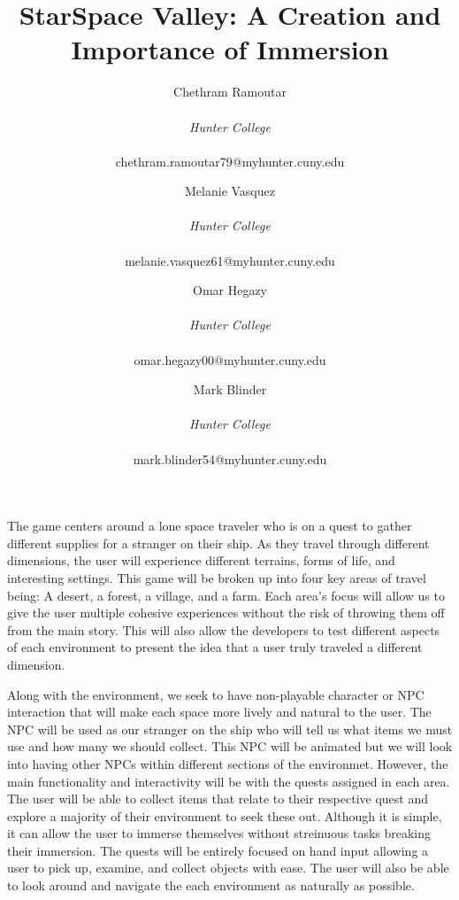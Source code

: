 \documentclass{vgtc}                          %
\title{StarSpace Valley: A Creation and Importance of Immersion}
\author{Chethram Ramoutar\\ %
    \parbox{1.4in}{\scriptsize  \centering\emph{Hunter College}}\\
    \scriptsize{chethram.ramoutar79@myhunter.cuny.edu}
\and Melanie Vasquez\\ %
    \parbox{1.4in}{\scriptsize \centering\emph{Hunter College}}\\
    \scriptsize{melanie.vasquez61@myhunter.cuny.edu}
\and Omar Hegazy\\ %
    \parbox{1.4in}{\scriptsize  \centering\emph{Hunter College}}\\
    \scriptsize{omar.hegazy00@myhunter.cuny.edu}\\
\and Mark Blinder\\ %
    \parbox{1.4in}{\scriptsize  \centering\emph{Hunter College}}\\
    \scriptsize{mark.blinder54@myhunter.cuny.edu}}
\begin{document}
\maketitle



The game centers around a lone space traveler who is on a quest to gather different supplies for a stranger on their ship. As they travel through
different dimensions, the user will experience different terrains, forms of life, and interesting settings. This game will be broken up into four key
areas of travel being: A desert, a forest, a village, and a farm. Each area's focus will allow us to give the user multiple cohesive experiences without
the risk of throwing them off from the main story. This will also allow the developers to test different aspects of each environment to present the idea that
a user truly traveled a different dimension.

Along with the environment, we seek to have non-playable character or NPC interaction that will make each space more lively and natural to the user. The NPC will be used as our stranger on the ship who will tell us what items
we must use and how many we should collect. This NPC will be animated but we will look into having other NPCs within different sections of the environmet. However, the main
functionality and interactivity will be with the quests assigned in each area. The user will be able to collect items that relate to their respective quest and explore a majority
of their environment to seek these out. Although it is simple, it can allow the user to immerse themselves without streinuous tasks breaking their immersion. The quests will be entirely focused on
hand input allowing a user to pick up, examine, and collect objects with ease. The user will also be able to look around and navigate the each environment as naturally as possible.
\end{document}
